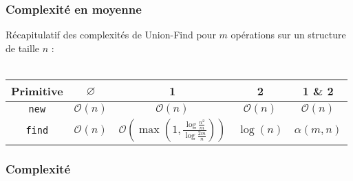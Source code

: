 \documentclass{beamer}
\begin{document}
			\begin{frame}
				\frametitle{Complexité en moyenne}

				Récapitulatif des complexités de Union-Find pour $m$
				opérations sur un structure de taille $n$ :
				\\~\\
				\begin{tabular}{|c|c|c|c|c|}
					\hline
					Primitive & $\varnothing$ & 1 & 2 & 1 \& 2
					\\
					\hline
					\texttt{new} & $\mathcal{O}(n)$ & $\mathcal{O}(n)$
					& $\mathcal{O}(n)$ & $\mathcal{O}(n)$
					\\
					\hline
					\texttt{find} & $\mathcal{O}(n)$ &
					$\mathcal{O}(\max(1,\frac
						{\log\frac{n^{2}}{m}}
						{\log\frac{2m}{n}}))$ &
					$\log(n)$ & $\alpha(m,n)$ 
					\\
					\hline
				\end{tabular}

			\end{frame}
			\begin{frame}
				\frametitle{Complexité}

				
			\end{frame}
\end{document}
